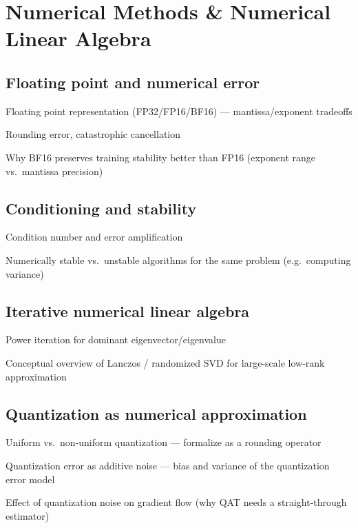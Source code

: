 \documentclass[11pt]{article}
\begin{document}
\section{Numerical Methods \& Numerical Linear Algebra}

\subsection{Floating point and numerical error}
\begin{tasklist}
    \item Floating point representation (FP32/FP16/BF16) — mantissa/exponent tradeoffs
    \item Rounding error, catastrophic cancellation
    \item Why BF16 preserves training stability better than FP16 (exponent range vs.\ mantissa precision)
\end{tasklist}

\subsection{Conditioning and stability}
\begin{tasklist}
    \item Condition number and error amplification
    \item Numerically stable vs.\ unstable algorithms for the same problem (e.g.\ computing variance)
\end{tasklist}

\subsection{Iterative numerical linear algebra}
\begin{tasklist}
    \item Power iteration for dominant eigenvector/eigenvalue
    \item Conceptual overview of Lanczos / randomized SVD for large-scale low-rank approximation
\end{tasklist}

\subsection{Quantization as numerical approximation}
\begin{tasklist}
    \item Uniform vs.\ non-uniform quantization — formalize as a rounding operator
    \item Quantization error as additive noise — bias and variance of the quantization error model
    \item Effect of quantization noise on gradient flow (why QAT needs a straight-through estimator)
\end{tasklist}
\end{document}
